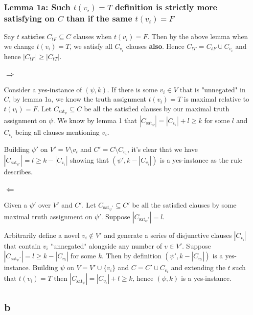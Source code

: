\documentclass{article}
\begin{document}
\subsubsection*{Lemma 1a: Such $t(v_i) = T$ definition is strictly more satisfying on $C$ than if the same $t(v_i) = F$}
Say $t$ satisfies $C_{tF} \subseteq C$ clauses when $t(v_i) = F$. Then by the above lemma when we change $t(v_i)=T$, we satisfy all $C_{v_i}$ clauses {\bf also}. Hence $C_{tT}$ = $C_{tF} \cup C_{v_i}$ and hence $|C_{tF}| \geq |C_{tT}|$.

\subsubsection*{$\Rightarrow$}

Consider a yes-instance of $(\psi, k)$. If there is some $v_i \in V$ that is "unnegated" in $C$, by lemma 1a, we know the truth assignment $t(v_i)=T$ is maximal relative to $t(v_i)=F$. Let $C_{\text{sat}_\psi} \subseteq C$ be all the satisfied clauses by our maximal truth assignment on $\psi$. We know by lemma 1 that $|C_{\text{sat}_\psi}| = |C_{v_i}| + l \geq k$ for some $l$ and $C_{v_i}$ being all clauses mentioning $v_i$.

Building $\psi'$ on $V'=V \setminus {v_i}$ and $C'=C \setminus C_{v_i}$, it's clear that we have $|C_{\text{sat}_{\psi'}}| = l \geq k - |C_{v_i}|$ showing that $(\psi', k - |C_{v_i}|)$ is a yes-instance as the rule describes.

\subsubsection*{$\Leftarrow$}
Given a $\psi'$ over $V'$ and $C'$. Let $C_{\text{sat}_\psi'} \subseteq C'$ be all the satisfied clauses by some maximal truth assignment on $\psi'$. Suppose $|C_{\text{sat}_\psi'}| = l$.

Arbitrarily define a novel $v_i \not\in V'$ and generate a series of disjunctive clauses $|C_{v_i}|$ that contain $v_i$ "unnegated" alongside any number of $v \in V'$. Suppose $|C_{\text{sat}_\psi'}| = l \geq k - |C_{v_i}|$ for some $k$. Then by definition $(\psi', k - |C_{v_i}|)$ is a yes-instance. Building $\psi$ on $V = V' \cup \{v_i\}$ and $C = C' \cup {C_{v_i}}$ and extending the $t$ such that $t(v_i)=T$ then $|C_{\text{sat}_\psi}| = |C_{v_i}| + l \geq k$, hence $(\psi, k)$ is a yes-instance.

\subsection*{b}
\end{document}
